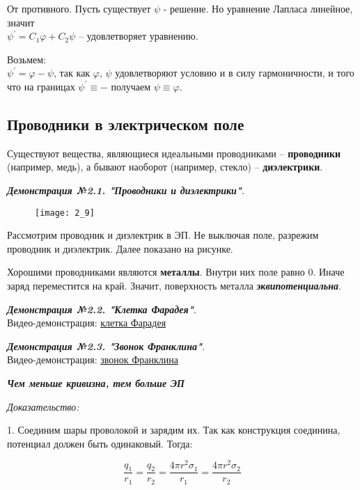 От противного. Пусть существует $\psi$ - решение. Но уравнение Лапласа линейное, значит \\
$\psi^{'} = C_{1} \varphi + C_{2} \psi$ -- удовлетворяет уравнению.

Возьмем:\\
$\psi^{'} = \varphi - \psi$, так как $\varphi$, $\psi$ удовлетворяют условию и в силу гармоничности, и того что на границах $\psi^{'} \equiv -$ получаем $\psi \equiv \varphi  $.

\subsection{Проводники в электрическом поле}

Существуют вещества, являющиеся идеальными проводниками -- \textbf{проводники} (например, медь), а бывают наоборот (например, стекло) -- \textbf{диэлектрики}.

\large
\textbf{\textit{Демонстрация №2.1. "Проводники и диэлектрики"}}.\\
\normalsize

\begin{figure}[!ht]
\centering
 \texttt{[image: 2\_9]}     
 \label{fig:my_label}
 \caption{}
\end{figure}

Рассмотрим проводник и диэлектрик в ЭП. Не выключая поле, разрежим проводник и диэлектрик. Далее показано на рисунке.

Хорошими проводниками являются \textbf{металлы}. Внутри них поле равно 0. Иначе заряд переместится на край. Значит, поверхность металла \textit{\textbf{эквипотенциальна}}.

\large
\textbf{\textit{Демонстрация №2.2. "Клетка Фарадея"}}.\\
\normalsize
Видео-демонстрация: \href{https://mipt.lectoriy.ru/lecture/Physics-Coursera-Electricity1-W4D4}{клетка Фарадея}

\large
\textbf{\textit{Демонстрация №2.3. "Звонок Франклина"}}.\\
\normalsize
Видео-демонстрация: \href{https://mipt.lectoriy.ru/lecture/Physics-Coursera-Electricity1-W6D2}{звонок Франклина}

\textit{\textbf{Чем меньше кривизна, тем больше ЭП}}

\textit{Доказательство:}

1. Соединим шары проволокой и зарядим их. Так как конструкция соединина, потенциал должен быть одинаковый. Тогда:

$$\frac{q_{1}}{r_{1}} = \frac{q_{2}}{r_{2}} = \frac{4 \pi r^{2} \sigma_{1}}{r_{1}} = \frac{4 \pi r^{2} \sigma_{2}}{r_{2}}$$

